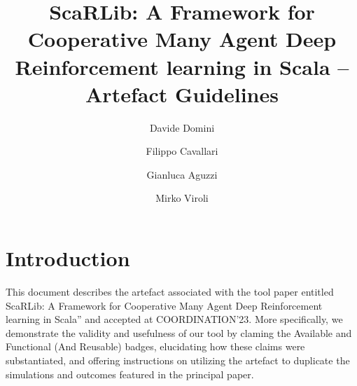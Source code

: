 \documentclass[runningheads]{llncs}
\begin{document}
%
\title{ScaRLib: A Framework for Cooperative Many Agent Deep Reinforcement learning in Scala -- Artefact Guidelines}
%
%
\author{
Davide Domini \and
Filippo Cavallari \and
Gianluca Aguzzi \and
Mirko Viroli}
%
%
%
\maketitle              %
\section{Introduction}

This document describes the artefact associated with the tool paper entitled ScaRLib: 
A Framework for Cooperative Many Agent Deep Reinforcement learning in Scala'' and accepted at COORDINATION'23.
%
More specifically, we demonstrate the validity and usefulness of our tool by claming 
 the Available and Functional (And Reusable) badges, 
 elucidating how these claims were substantiated, 
 and offering instructions on utilizing the artefact to duplicate the simulations 
 and outcomes featured in the principal paper.
\end{document}
